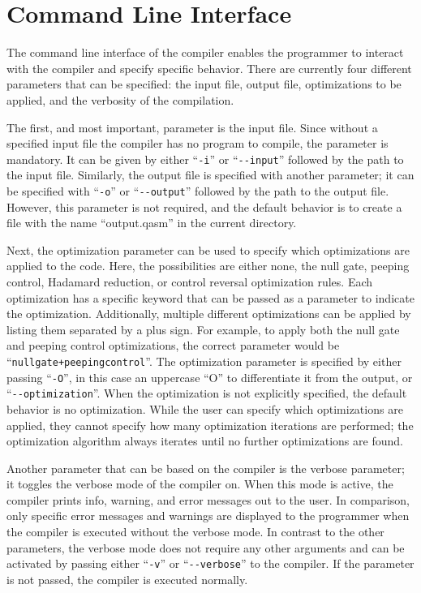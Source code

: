 \section{Command Line Interface}
The command line interface of the compiler enables the programmer to interact with the compiler and specify specific behavior. There are currently four different parameters that can be specified: the input file, output file, optimizations to be applied, and the verbosity of the compilation. 

The first, and most important, parameter is the input file. Since without a specified input file the compiler has no program to compile, the parameter is mandatory. It can be given by either ``\texttt{-i}'' or ``\texttt{-{}-input}'' followed by the path to the input file. Similarly, the output file is specified with another parameter; it can be specified with ``\texttt{-o}'' or ``\texttt{-{}-output}'' followed by the path to the output file. However, this parameter is not required, and the default behavior is to create a file with the name ``output.qasm'' in the current directory.

Next, the optimization parameter can be used to specify which optimizations are applied to the code. Here, the possibilities are either none, the null gate, peeping control, Hadamard reduction, or control reversal optimization rules. Each optimization has a specific keyword that can be passed as a parameter to indicate the optimization. Additionally, multiple different optimizations can be applied by listing them separated by a plus sign.
For example, to apply both the null gate and peeping control optimizations, the correct parameter would be ``\texttt{nullgate+peepingcontrol}''. The optimization parameter is specified by either passing ``\texttt{-O}'', in this case an uppercase ``O'' to differentiate it from the output, or ``\texttt{-{}-optimization}''. When the optimization is not explicitly specified, the default behavior is no optimization. While the user can specify which optimizations are applied, they cannot specify how many optimization iterations are performed; the optimization algorithm always iterates until no further optimizations are found.

Another parameter that can be based on the compiler is the verbose parameter; it toggles the verbose mode of the compiler on. When this mode is active, the compiler prints info, warning, and error messages out to the user. In comparison, only specific error messages and warnings are displayed to the programmer when the compiler is executed without the verbose mode. In contrast to the other parameters, the verbose mode does not require any other arguments and can be activated by passing either ``\texttt{-v}'' or ``\texttt{-{}-verbose}'' to the compiler. If the parameter is not passed, the compiler is executed normally. 

